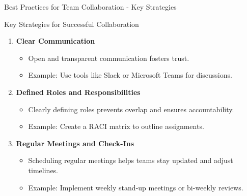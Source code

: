 \documentclass[aspectratio=169]{beamer}
\begin{document}
\begin{frame}[fragile]{Best Practices for Team Collaboration - Key Strategies}
    \begin{block}{Key Strategies for Successful Collaboration}
        \begin{enumerate}
            \item \textbf{Clear Communication}
            \begin{itemize}
                \item Open and transparent communication fosters trust.
                \item Example: Use tools like Slack or Microsoft Teams for discussions.
            \end{itemize}
            
            \item \textbf{Defined Roles and Responsibilities}
            \begin{itemize}
                \item Clearly defining roles prevents overlap and ensures accountability.
                \item Example: Create a RACI matrix to outline assignments.
            \end{itemize}

            \item \textbf{Regular Meetings and Check-Ins}
            \begin{itemize}
                \item Scheduling regular meetings helps teams stay updated and adjust timelines.
                \item Example: Implement weekly stand-up meetings or bi-weekly reviews.
            \end{itemize}
        \end{enumerate}
    \end{block}
\end{frame}
\end{document}
